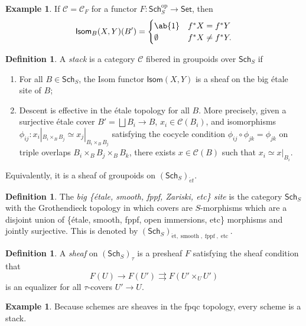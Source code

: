 \documentclass{amsart}
\theoremstyle{definition}
\newtheorem{defn}[thm]{Definition}
\newtheorem{exm}[thm]{Example}
\theoremstyle{remark}
\theoremstyle{plain}
\theoremstyle{definition}
\theoremstyle{remark}
\newcommand{\mc}[1]{\mathcal{#1}}
\newcommand{\on}[1]{\operatorname{#1}}
\newcommand{\ms}[1]{\mathsf{#1}}
\newcommand{\1}{\mathbf{1}}
\newcommand{\2}{\mathbf{2}}
\newcommand{\3}{\mathbf{3}}
\begin{document}
\begin{exm}
    If \(\mc{C} = \mc{C}_F\) for a functor \(F \colon \ms{Sch}_S^{\on{op}} \to \ms{Set}\), then
    \[ \ms{Isom}_B (X, Y) (B') = \begin{cases}
        \ab\{1\} & f^* X = f^* Y \\
        \emptyset & f^* X \neq f^* Y.
    \end{cases} \]
\end{exm}

\begin{defn}
    A \textit{stack} is a category \(\mc{C}\) fibered in groupoids over \(\ms{Sch}_S\) if
    \begin{enumerate}
        \item For all \(B \in \ms{Sch}_S\), the Isom functor \(\ms{Isom}(X, Y)\) is a sheaf on the big \'etale site of \(B\);
        \item Descent is effective in the \'etale topology for all \(B\). More precisely, given a surjective \'etale cover \(B' = \bigsqcup B_i \to B\), \(x_i \in \mc{C}(B_i)\), and isomorphisms \(\phi_{ij} \colon x_i|_{B_i \times_B B_j} \simeq x_j|_{B_i \times_B B_j}\) satisfying the cocycle condition \(\phi_{ij} \circ \phi_{jk} = \phi_{jk}\) on triple overlaps \(B_i \times_B B_j \times_B B_k\), there exists \(x \in \mc{C}(B)\) such that \(x_i \simeq x|_{B_i}\).
    \end{enumerate}
    Equivalently, it is a sheaf of groupoids on \((\ms{Sch}_S)_{\acute{e}t}\).
\end{defn}

\begin{defn}
    The \textit{big \{\'etale, smooth, fppf, Zariski, etc\} site} is the category \(\ms{Sch}_S\) with the Grothendieck topology in which covers are \(S\)-morphisms which are a disjoint union of \{\'etale, smooth, fppf, open immersions, etc\} morphisms and jointly surjective. This is denoted by \((\ms{Sch}_S)_{\on{\acute{e}t}, \on{smooth}, \on{fppf}, \on{etc}}\). 
\end{defn}

\begin{defn}
    A \textit{sheaf} on \((\ms{Sch}_S)_{\tau}\) is a presheaf \(F\) satisfying the sheaf condition that
    \[ F(U) \to F(U') \rightrightarrows F(U' \times_U U') \]
    is an equalizer for all \(\tau\)-covers \(U' \to U\).
\end{defn}

\begin{exm}
    Because schemes are sheaves in the fpqc topology, every scheme is a stack.
\end{exm}
\end{document}
